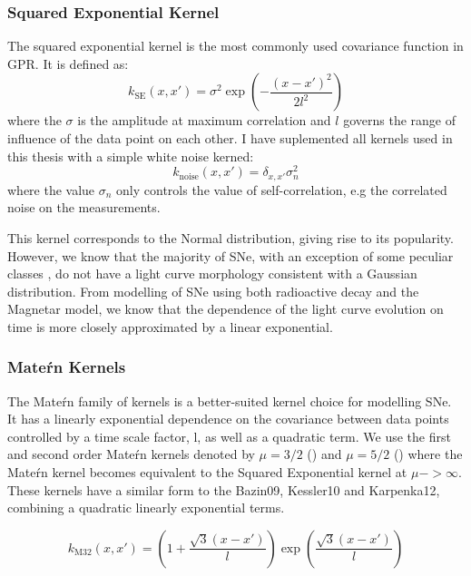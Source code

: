 \subsubsection{Squared Exponential Kernel}
The squared exponential kernel is the most commonly used covariance function in GPR. It is defined as:
\begin{equation}
  k_{\textrm{SE}}(x,x') = \sigma^2 \exp\left(-\frac{(x - x')^2}{2l^2}\right)
\end{equation}
\noindent where the $\sigma$ is the amplitude at maximum correlation and $l$ governs the range of influence of the data point on each other. I have suplemented all kernels used in this thesis with a simple white noise kerned:
\begin{equation}
  k_{\textrm{noise}}(x,x') = \delta_{x,x'}\sigma_n^2
\end{equation}
\noindent where the value $\sigma_n$ only controls the value of self-correlation, e.g the correlated noise on the measurements.

This kernel corresponds to the Normal distribution, giving rise to its popularity. However, we know that the majority of SNe, with an exception of some peculiar classes \citep{Pursiainen2018}, do not have a light curve morphology consistent with a Gaussian distribution. From modelling of SNe using both radioactive decay and the Magnetar model, we know that the dependence of the light curve evolution on time is more closely approximated by a linear exponential.

\subsubsection{Mate\'rn Kernels}
The Mate\'rn family of kernels is a better-suited kernel choice for modelling SNe. It has a linearly exponential dependence on the covariance between data points controlled by a time scale factor, l, as well as a quadratic term. We use the first and second order Mate\'rn kernels denoted by $\mu = 3/2$ () and $\mu = 5/2$ () where the Mate\'rn kernel becomes equivalent to the Squared Exponential kernel at $\mu -> \infty$. These kernels have a similar form to the Bazin09, Kessler10 and Karpenka12, combining a quadratic linearly exponential terms.

\begin{equation} \label{eq:M32}
  k_{\textrm{M32}}(x,x') = \left(1 + \frac{\sqrt{3}(x - x')}{l}\right) \exp \left( \frac{\sqrt{3}(x - x')}{l} \right)
\end{equation}

